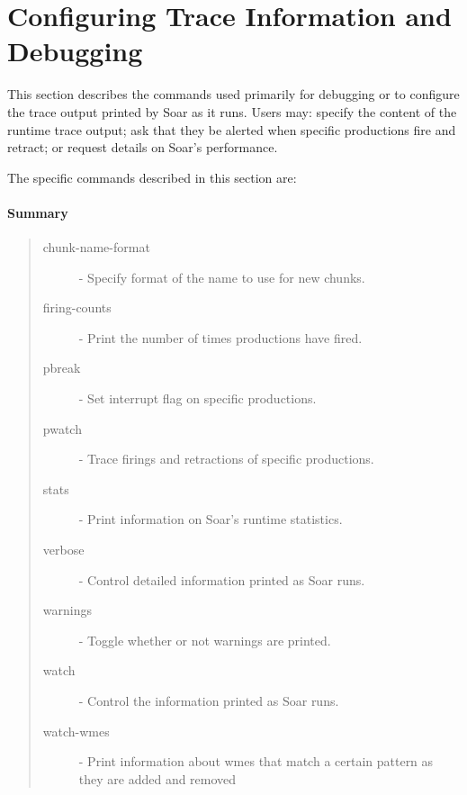 \section{Configuring Trace Information and Debugging}
\label{DEBUG}

This section describes the commands used primarily for debugging or
to configure the trace output printed by Soar as it runs.  Users may:
specify the content of the runtime trace output; ask that
they be alerted when specific productions fire and retract; 
or request details on Soar's performance.

The specific commands described in this section are:


\paragraph{Summary}
\begin{quote}
\begin{description}
\item[chunk-name-format] - Specify format of the name to use for new chunks.
\item[firing-counts] - Print the number of times productions have fired.
\item[pbreak] - Set interrupt flag on specific productions.
\item[pwatch] - Trace firings and retractions of specific productions.
\item[stats] - Print information on Soar's runtime statistics.
\item[verbose] -  Control detailed information printed as Soar runs.
\item[warnings] - Toggle whether or not warnings are printed.
\item[watch] - Control the information printed as Soar runs.
\item[watch-wmes] -  Print information about wmes that match a certain pattern as they are added and removed
\end{description}
\end{quote}


